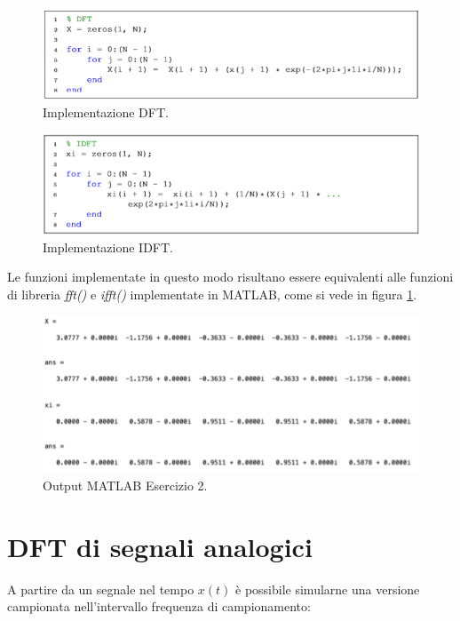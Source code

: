\begin{minipage}[t]{.45\textwidth}
	\begin{figure}[H]
	\centering
	\includegraphics[width=\textwidth]{./images/cap3/DFT.png}
	\caption{Implementazione DFT.}
\end{figure}
\end{minipage}
\hfill
\begin{minipage}[t]{.45\textwidth}
	\begin{figure}[H]
	\centering
	\includegraphics[width=\textwidth]{./images/cap3/IDFT.png}
	\caption{Implementazione IDFT.}
\end{figure}	
\end{minipage}

\pagebreak

Le funzioni implementate in questo modo risultano essere equivalenti alle 
funzioni di libreria \textit{fft()} e \textit{ifft()} implementate in MATLAB, 
come si vede in figura \ref{fig:output_L2E2}.

\begin{figure}[H]
\centering
\includegraphics[width=.75\textwidth]{./images/cap3/output_L2E2.png}
\caption{Output MATLAB Esercizio 2.}
\label{fig:output_L2E2}
\end{figure}

\section{DFT di segnali analogici}
A partire da un segnale nel tempo $x(t)$ è possibile simularne una versione 
campionata nell’intervallo frequenza di campionamento:


